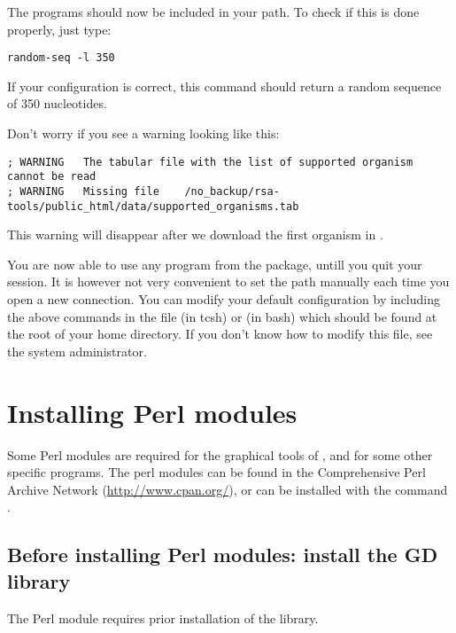 \documentclass[12pt,a4paper, oneside]{scrreprt} %
\begin{document}
The \RSAT programs should now be included in your path.  To check if
this is done properly, just type:

\begin{lstlisting}
random-seq -l 350
\end{lstlisting}

If your configuration is correct, this command should return a random
sequence of 350 nucleotides.

Don't worry if you see a warning looking like this:

\begin{footnotesize}
\begin{verbatim}
; WARNING	The tabular file with the list of supported organism cannot be read
; WARNING	Missing file	/no_backup/rsa-tools/public_html/data/supported_organisms.tab
\end{verbatim}
\end{footnotesize}

This warning will disappear after we download the first organism in
\RSAT.

You are now able to use any program from the \RSAT package, untill you
quit your session. It is however not very convenient to set the path
manually each time you open a new connection. You can modify your
default configuration by including the above commands in the file
 (in tcsh) or  (in bash) which should be
found at the root of your home directory. If you don't know how to
modify this file, see the system administrator.

\chapter{Installing Perl modules}
\label{chap:perl_modules}

Some Perl modules are required for the graphical tools of \RSAT, and
for some other specific programs. The perl modules can be found in the
Comprehensive Perl Archive Network (\url{http://www.cpan.org/}), or
can be installed with the command .

\section{Before installing Perl modules: install the GD library}

The Perl module  requires prior installation of the
 library.
\end{document}
